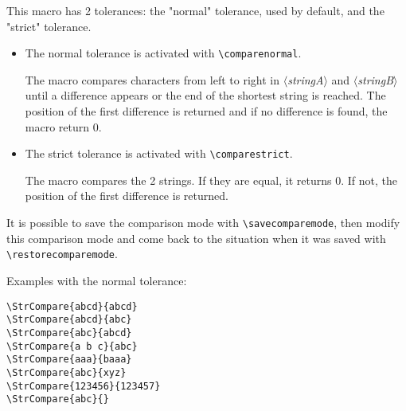 \documentclass[a4paper,10pt]{article}
\newcommand\argu[1]{$\langle$\textit{#1}$\rangle$}
\newcommand\styleexemple{\small\vskip4pt}
\newcommand\verbinline{\lstinline[basicstyle=\normalsize\ttfamily]}
\begin{document}
This macro has 2 tolerances: the "normal" tolerance, used by default, and the "strict" tolerance.
\begin{itemize}
	\item The normal tolerance is activated with \verbinline|\comparenormal|.\par
	The macro compares characters from left to right in \argu{stringA} and \argu{stringB} until a difference appears or the end of the shortest string is reached. The position of the first difference is returned and if no difference is found, the macro return 0.
	\item The strict tolerance is activated with \verbinline|\comparestrict|.\par
	The macro compares the 2 strings. If they are equal, it returns 0. If not, the position of the first difference is returned.
\end{itemize}
\medskip

It is possible to save the comparison mode with \verbinline|\savecomparemode|, then modify this comparison mode and come back to the situation when it was saved with \verbinline|\restorecomparemode|.\medskip

Examples with the normal tolerance:\par\nobreak
\begin{minipage}[t]{0.65\linewidth}
\comparenormal
\begin{lstlisting}
\StrCompare{abcd}{abcd}
\StrCompare{abcd}{abc}
\StrCompare{abc}{abcd}
\StrCompare{a b c}{abc}
\StrCompare{aaa}{baaa}
\StrCompare{abc}{xyz}
\StrCompare{123456}{123457}
\StrCompare{abc}{}
\end{lstlisting}%
\end{minipage}\hfill
\begin{minipage}[t]{0.35\linewidth}
	\styleexemple
	\comparenormal
	\par
	\par
	\par
	\par
	\par
	\par
	\par
\end{minipage}%
\medskip
\end{document}
